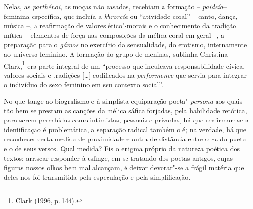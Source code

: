 Nelas, as \textit{parthénoi}, as moças não casadas, recebiam a formação -- \textit{paideía}-- feminina específica, que incluía a \textit{khroreía} ou ``atividade coral'' -- canto, dança, música --, a reafirmação de valores ético"-morais e o conhecimento da tradição mítica -- elementos de força nas composições da mélica coral em geral --, a preparação para o \textit{gámos} no exercício da sensualidade, do erotismo, internamente ao universo feminino. A formação do grupo de meninas, sublinha Christina Clark,\footnote{Clark (1996, p.\,144).} era parte integral de um “processo que inculcava responsabilidade cívica, valores sociais e tradições [\ldots{}] codificados na \textit{performance} que servia para integrar o indivíduo do sexo feminino em seu contexto social”.


No que tange ao biografismo e à simplista equiparação poeta"-\textit{persona} aos quais tão bem se prestam as canções da mélica sáfica forjadas, pela habilidade retórica, para serem percebidas como intimistas, pessoais e privadas, há que reafirmar: se a identificação é problemática,
a separação radical também o é; na verdade, há que reconhecer certa medida de
proximidade e outra de distância entre o \textit{eu} do poeta e o de seus versos. Qual
medida? Eis o enigma próprio da natureza poética dos textos; arriscar
responder à esfinge, em se tratando dos poetas antigos, cujas figuras nossos
olhos bem mal alcançam, é deixar devorar"-se a frágil matéria que deles nos foi
transmitida pela especulação e pela simplificação.

